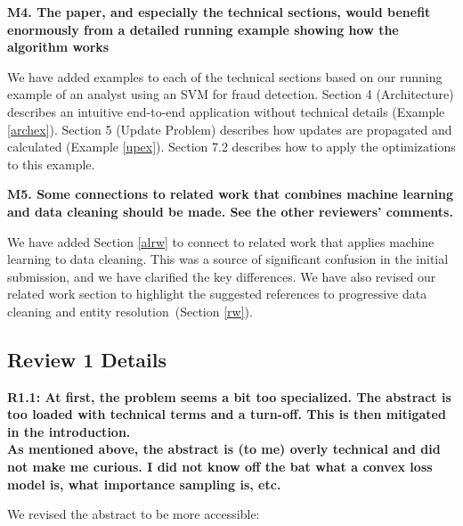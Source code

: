 \vspace{0.5em}

\noindent\textbf{M4. The paper, and especially the technical sections, would benefit enormously from a detailed running example showing how the algorithm works}

We have added examples to each of the technical sections based on our running example of an analyst using an SVM for fraud detection. 
Section 4 (Architecture) describes an intuitive end-to-end application without technical details (Example \ref{archex}).
Section 5 (Update Problem) describes how updates are propagated and calculated (Example \ref{upex}).
Section 7.2 describes how to apply the optimizations to this example.

\vspace{0.5em}

\noindent\textbf{M5. Some connections to related work that combines machine learning and data cleaning should be made. See the other reviewers' comments.}

We have added Section \ref{alrw} to connect \sys to related work that applies machine learning to data cleaning.
This was a source of significant confusion in the initial submission, and we have clarified the key differences.
We have also revised our related work section to highlight the suggested references to progressive data cleaning and entity resolution~(Section \ref{rw}).

\subsection*{Review 1 Details} 

\noindent\textbf{R1.1: At first, the problem seems a bit too specialized. The abstract is too loaded with technical terms and a turn-off. This is then mitigated in the introduction. \\
As mentioned above, the abstract is (to me) overly technical and did not make me curious. I did not know off the bat what a convex loss model is, what importance sampling is, etc.}

\noindent We revised the abstract to be more accessible:

